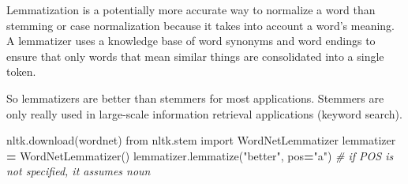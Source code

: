 \documentclass[
]{book}
\newenvironment{Shaded}{\begin{snugshade}}{\end{snugshade}}
\newcommand{\CommentTok}[1]{\textcolor[rgb]{0.56,0.35,0.01}{\textit{#1}}}
\newcommand{\ImportTok}[1]{#1}
\newcommand{\NormalTok}[1]{#1}
\newcommand{\OperatorTok}[1]{\textcolor[rgb]{0.81,0.36,0.00}{\textbf{#1}}}
\newcommand{\StringTok}[1]{\textcolor[rgb]{0.31,0.60,0.02}{#1}}
\begin{document}
Lemmatization is a potentially more accurate way to normalize a word than stemming or case normalization because it takes into account a word's meaning. A lemmatizer uses a knowledge base of word synonyms and word endings to ensure that only words that mean similar things are consolidated into a single token.

So lemmatizers are better than stemmers for most applications. Stemmers are only really used in large-scale information retrieval applications (keyword search).

\begin{Shaded}
\begin{Highlighting}[]
\NormalTok{nltk.download(}\StringTok{\textquotesingle{}wordnet\textquotesingle{}}\NormalTok{)}
\ImportTok{from}\NormalTok{ nltk.stem }\ImportTok{import}\NormalTok{ WordNetLemmatizer}
\NormalTok{lemmatizer }\OperatorTok{=}\NormalTok{ WordNetLemmatizer()}
\NormalTok{lemmatizer.lemmatize(}\StringTok{"better"}\NormalTok{, pos}\OperatorTok{=}\StringTok{"a"}\NormalTok{) }\CommentTok{\# if POS is not specified, it assumes noun}
\end{Highlighting}
\end{Shaded}


  
\end{document}
